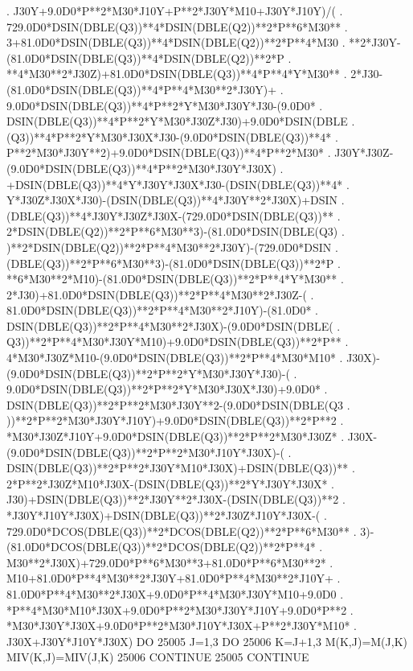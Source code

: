 \begin{framedverbatim}
     . J30Y+9.0D0*P**2*M30*J10Y+P**2*J30Y*M10+J30Y*J10Y)/(
     . 729.0D0*DSIN(DBLE(Q3))**4*DSIN(DBLE(Q2))**2*P**6*M30**
     . 3+81.0D0*DSIN(DBLE(Q3))**4*DSIN(DBLE(Q2))**2*P**4*M30
     . **2*J30Y-(81.0D0*DSIN(DBLE(Q3))**4*DSIN(DBLE(Q2))**2*P
     . **4*M30**2*J30Z)+81.0D0*DSIN(DBLE(Q3))**4*P**4*Y*M30**
     . 2*J30-(81.0D0*DSIN(DBLE(Q3))**4*P**4*M30**2*J30Y)+
     . 9.0D0*DSIN(DBLE(Q3))**4*P**2*Y*M30*J30Y*J30-(9.0D0*
     . DSIN(DBLE(Q3))**4*P**2*Y*M30*J30Z*J30)+9.0D0*DSIN(DBLE
     . (Q3))**4*P**2*Y*M30*J30X*J30-(9.0D0*DSIN(DBLE(Q3))**4*
     . P**2*M30*J30Y**2)+9.0D0*DSIN(DBLE(Q3))**4*P**2*M30*
     . J30Y*J30Z-(9.0D0*DSIN(DBLE(Q3))**4*P**2*M30*J30Y*J30X)
     . +DSIN(DBLE(Q3))**4*Y*J30Y*J30X*J30-(DSIN(DBLE(Q3))**4*
     . Y*J30Z*J30X*J30)-(DSIN(DBLE(Q3))**4*J30Y**2*J30X)+DSIN
     . (DBLE(Q3))**4*J30Y*J30Z*J30X-(729.0D0*DSIN(DBLE(Q3))**
     . 2*DSIN(DBLE(Q2))**2*P**6*M30**3)-(81.0D0*DSIN(DBLE(Q3)
     . )**2*DSIN(DBLE(Q2))**2*P**4*M30**2*J30Y)-(729.0D0*DSIN
     . (DBLE(Q3))**2*P**6*M30**3)-(81.0D0*DSIN(DBLE(Q3))**2*P
     . **6*M30**2*M10)-(81.0D0*DSIN(DBLE(Q3))**2*P**4*Y*M30**
     . 2*J30)+81.0D0*DSIN(DBLE(Q3))**2*P**4*M30**2*J30Z-(
     . 81.0D0*DSIN(DBLE(Q3))**2*P**4*M30**2*J10Y)-(81.0D0*
     . DSIN(DBLE(Q3))**2*P**4*M30**2*J30X)-(9.0D0*DSIN(DBLE(
     . Q3))**2*P**4*M30*J30Y*M10)+9.0D0*DSIN(DBLE(Q3))**2*P**
     . 4*M30*J30Z*M10-(9.0D0*DSIN(DBLE(Q3))**2*P**4*M30*M10*
     . J30X)-(9.0D0*DSIN(DBLE(Q3))**2*P**2*Y*M30*J30Y*J30)-(
     . 9.0D0*DSIN(DBLE(Q3))**2*P**2*Y*M30*J30X*J30)+9.0D0*
     . DSIN(DBLE(Q3))**2*P**2*M30*J30Y**2-(9.0D0*DSIN(DBLE(Q3
     . ))**2*P**2*M30*J30Y*J10Y)+9.0D0*DSIN(DBLE(Q3))**2*P**2
     . *M30*J30Z*J10Y+9.0D0*DSIN(DBLE(Q3))**2*P**2*M30*J30Z*
     . J30X-(9.0D0*DSIN(DBLE(Q3))**2*P**2*M30*J10Y*J30X)-(
     . DSIN(DBLE(Q3))**2*P**2*J30Y*M10*J30X)+DSIN(DBLE(Q3))**
     . 2*P**2*J30Z*M10*J30X-(DSIN(DBLE(Q3))**2*Y*J30Y*J30X*
     . J30)+DSIN(DBLE(Q3))**2*J30Y**2*J30X-(DSIN(DBLE(Q3))**2
     . *J30Y*J10Y*J30X)+DSIN(DBLE(Q3))**2*J30Z*J10Y*J30X-(
     . 729.0D0*DCOS(DBLE(Q3))**2*DCOS(DBLE(Q2))**2*P**6*M30**
     . 3)-(81.0D0*DCOS(DBLE(Q3))**2*DCOS(DBLE(Q2))**2*P**4*
     . M30**2*J30X)+729.0D0*P**6*M30**3+81.0D0*P**6*M30**2*
     . M10+81.0D0*P**4*M30**2*J30Y+81.0D0*P**4*M30**2*J10Y+
     . 81.0D0*P**4*M30**2*J30X+9.0D0*P**4*M30*J30Y*M10+9.0D0
     . *P**4*M30*M10*J30X+9.0D0*P**2*M30*J30Y*J10Y+9.0D0*P**2
     . *M30*J30Y*J30X+9.0D0*P**2*M30*J10Y*J30X+P**2*J30Y*M10*
     . J30X+J30Y*J10Y*J30X)
      DO 25005 J=1,3
          DO 25006 K=J+1,3
              M(K,J)=M(J,K)
              MIV(K,J)=MIV(J,K)
25006     CONTINUE
25005 CONTINUE
\end{framedverbatim}

